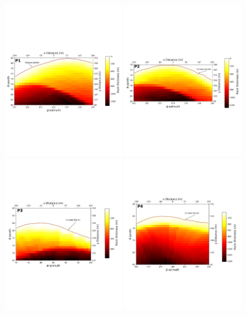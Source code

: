 \documentclass[letterpaper,10pt,titlepage,linenumber]{article}
\begin{document}
\begin{figure}[!ht]
\centering
\includegraphics[width=0.45\textwidth]{Figures/distP1_2}
\includegraphics[width=0.45\textwidth]{Figures/distP2_2}\\
\includegraphics[width=0.45\textwidth]{Figures/distP3_2}
\includegraphics[width=0.45\textwidth]{Figures/distP4_2}

\end{figure}
\end{document}
